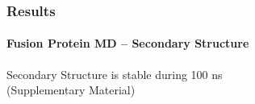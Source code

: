 \documentclass[english]{beamer}
\begin{document}

\begin{frame}
    \frametitle{Results}
    \framesubtitle{Fusion Protein MD -- Secondary Structure}  

    \centering
    Secondary Structure is stable during 100 ns \\
    (Supplementary Material)
    
\end{frame}      


\end{document}

